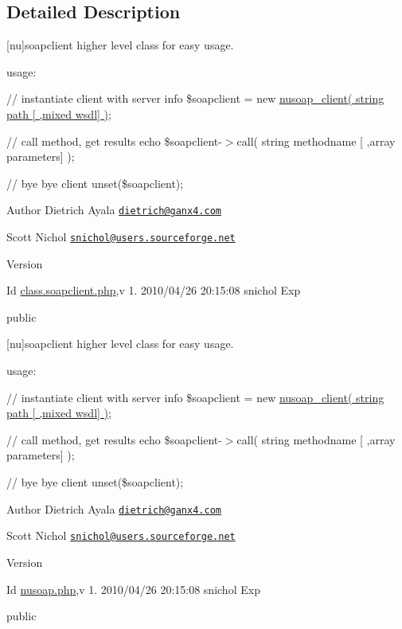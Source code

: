 \subsection{Detailed Description}
\mbox{[}nu\mbox{]}soapclient higher level class for easy usage.

usage\+:

// instantiate client with server info \$soapclient = new \hyperlink{classnusoap__client}{nusoap\+\_\+client( string path \mbox{[} ,mixed wsdl\mbox{]} )};

// call method, get results echo \$soapclient-\/$>$call( string methodname \mbox{[} ,array parameters\mbox{]} );

// bye bye client unset(\$soapclient);

\begin{DoxyAuthor}{Author}
Dietrich Ayala \href{mailto:dietrich@ganx4.com}{\tt dietrich@ganx4.\+com} 

Scott Nichol \href{mailto:snichol@users.sourceforge.net}{\tt snichol@users.\+sourceforge.\+net} 
\end{DoxyAuthor}
\begin{DoxyVersion}{Version}

\end{DoxyVersion}
\begin{DoxyParagraph}{Id}
\hyperlink{class_8soapclient_8php}{class.\+soapclient.\+php},v 1. 2010/04/26 20\+:15\+:08 snichol Exp 
\end{DoxyParagraph}
public

\mbox{[}nu\mbox{]}soapclient higher level class for easy usage.

usage\+:

// instantiate client with server info \$soapclient = new \hyperlink{classnusoap__client}{nusoap\+\_\+client( string path \mbox{[} ,mixed wsdl\mbox{]} )};

// call method, get results echo \$soapclient-\/$>$call( string methodname \mbox{[} ,array parameters\mbox{]} );

// bye bye client unset(\$soapclient);

\begin{DoxyAuthor}{Author}
Dietrich Ayala \href{mailto:dietrich@ganx4.com}{\tt dietrich@ganx4.\+com} 

Scott Nichol \href{mailto:snichol@users.sourceforge.net}{\tt snichol@users.\+sourceforge.\+net} 
\end{DoxyAuthor}
\begin{DoxyVersion}{Version}

\end{DoxyVersion}
\begin{DoxyParagraph}{Id}
\hyperlink{nusoap_8php}{nusoap.\+php},v 1. 2010/04/26 20\+:15\+:08 snichol Exp 
\end{DoxyParagraph}
public 

